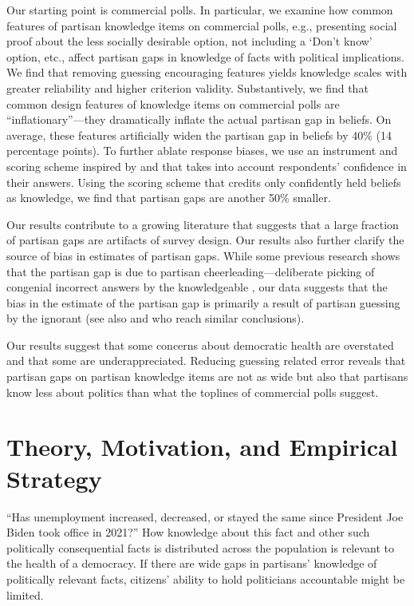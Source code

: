 \documentclass[12pt, letterpaper]{article}
\begin{document}
Our starting point is commercial polls. In particular, we examine how common features of partisan knowledge items on commercial polls, e.g., presenting social proof about the less socially desirable option, not including a `Don't know' option, etc., affect partisan gaps in knowledge of facts with political implications. We find that removing guessing encouraging features yields knowledge scales with greater reliability and higher criterion validity. Substantively, we find that common design features of knowledge items on commercial polls are ``inflationary''---they dramatically inflate the actual partisan gap in beliefs. On average, these features artificially widen the partisan gap in beliefs by 40\% (14 percentage points). To further ablate response biases, we use an instrument and scoring scheme inspired by \citet{pasek2015} and \citet{graham2021measuring} that takes into account respondents' confidence in their answers. Using the scoring scheme that credits only confidently held beliefs as knowledge, we find that partisan gaps are another 50\% smaller.

Our results contribute to a growing literature that suggests that a large fraction of partisan gaps are artifacts of survey design. Our results also further clarify the source of bias in estimates of partisan gaps. While some previous research shows that the partisan gap is due to partisan cheerleading---deliberate picking of congenial incorrect answers by the knowledgeable \citep{prior2015you}, our data suggests that the bias in the estimate of the partisan gap is primarily a result of partisan guessing by the ignorant (see also \citet{bullocketal_2015} and \citet{graham2023less} who reach similar conclusions). 

Our results suggest that some concerns about democratic health are overstated and that some are underappreciated. Reducing guessing related error reveals that partisan gaps on partisan knowledge items are not as wide but also that partisans know less about politics than what the toplines of commercial polls suggest.

\section*{Theory, Motivation, and Empirical Strategy}\label{sec:theory}

``Has unemployment increased, decreased, or stayed the same since President Joe Biden took office in 2021?'' How knowledge about this fact and other such politically consequential facts is distributed across the population is relevant to the health of a democracy. If there are wide gaps in partisans' knowledge of politically relevant facts, citizens' ability to hold politicians accountable might be limited.
\end{document}
